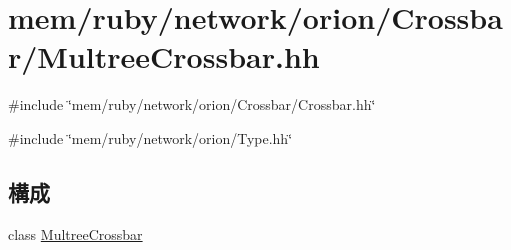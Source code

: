 \hypertarget{MultreeCrossbar_8hh}{
\section{mem/ruby/network/orion/Crossbar/MultreeCrossbar.hh}
\label{MultreeCrossbar_8hh}
}
{\ttfamily \#include \char`\"{}mem/ruby/network/orion/Crossbar/Crossbar.hh\char`\"{}}\par
{\ttfamily \#include \char`\"{}mem/ruby/network/orion/Type.hh\char`\"{}}\par
\subsection*{構成}
\begin{DoxyCompactItemize}
\item 
class \hyperlink{classMultreeCrossbar}{MultreeCrossbar}
\end{DoxyCompactItemize}
